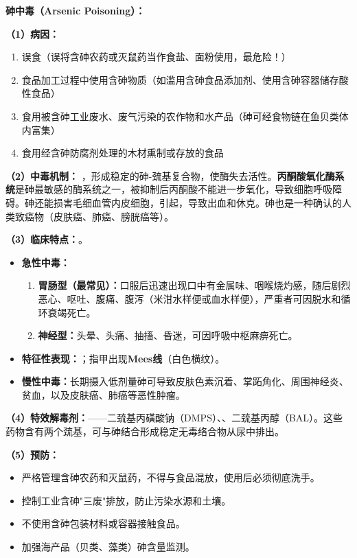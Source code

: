 \begin{keybox}
\textbf{砷中毒（Arsenic Poisoning）：}

\textbf{（1）病因：}
\begin{enumerate}[leftmargin=*]
    \item 误食（误将含砷农药或灭鼠药当作食盐、面粉使用，最危险！）
    \item 食品加工过程中使用含砷物质（如滥用含砷食品添加剂、使用含砷容器储存酸性食品）
    \item 食用被含砷工业废水、废气污染的农作物和水产品（砷可经食物链在鱼贝类体内富集）
    \item 食用经含砷防腐剂处理的木材熏制或存放的食品
\end{enumerate}

\textbf{（2）中毒机制：}\difficulty
{}，形成稳定的砷-巯基复合物，使酶失去活性。\textbf{丙酮酸氧化酶系统}是砷最敏感的酶系统之一，被抑制后丙酮酸不能进一步氧化，导致细胞呼吸障碍。砷还能损害毛细血管内皮细胞，引起，导致出血和休克。砷也是一种确认的人类致癌物（皮肤癌、肺癌、膀胱癌等）。

\textbf{（3）临床特点：}。
\begin{itemize}[leftmargin=*]
    \item \textbf{急性中毒：}
    \begin{enumerate}
        \item \textbf{胃肠型（最常见）：}口服后迅速出现口中有金属味、咽喉烧灼感，随后剧烈恶心、呕吐、腹痛、腹泻（米泔水样便或血水样便），严重者可因脱水和循环衰竭死亡。
        \item \textbf{神经型：}头晕、头痛、抽搐、昏迷，可因呼吸中枢麻痹死亡。
    \end{enumerate}
    \item \textbf{特征性表现：}；指甲出现\textbf{Mees线}（白色横纹）。
    \item \textbf{慢性中毒：}长期摄入低剂量砷可导致皮肤色素沉着、掌跖角化、周围神经炎、贫血，以及皮肤癌、肺癌等恶性肿瘤。
\end{itemize}

\textbf{（4）特效解毒剂：}——二巯基丙磺酸钠（DMPS）、、二巯基丙醇（BAL）。这些药物含有两个巯基，可与砷结合形成稳定无毒络合物从尿中排出。

\textbf{（5）预防：}
\begin{itemize}[leftmargin=*]
    \item 严格管理含砷农药和灭鼠药，不得与食品混放，使用后必须彻底洗手。
    \item 控制工业含砷"三废"排放，防止污染水源和土壤。
    \item 不使用含砷包装材料或容器接触食品。
    \item 加强海产品（贝类、藻类）砷含量监测。
\end{itemize}
\end{keybox}

